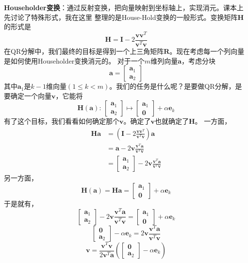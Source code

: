 \documentclass[14pt, letterpaper, UTF8, fontset=windowsnew, heading=true]{article}
\begin{document}
\textbf{Householder变换}：通过反射变换，把向量映射到坐标轴上，实现消元。课本上先讨论了特殊形式，我在这里
整理的是House-Hold变换的一般形式。变换矩阵$\bm{H}$的形式是
$$\bm{H} = \bm{I} - 2\frac{\bm{vv}^T}{\bm{v}^T\bm{v}}$$
在QR分解中，我们最终的目标是得到一个上三角矩阵$\bm{R}$。现在考虑每一个列向量是如何使用Householder变换消元的。
对于一个$m$维列向量$\bm{a}$，考虑分块
$$\bm{a}=\begin{bmatrix}\bm{a}_1\\\bm{a}_2\end{bmatrix}$$
其中$\bm{a}_1$是$k-1$维向量$(1\leq k< m)$。我们的任务是什么呢？是要做QR分解，是要确定一个向量$\bm{v}$，它能将
$$\bm{H(\bm{a})}:\,
\begin{bmatrix}\bm{a}_1\\ \bm{a}_2\end{bmatrix}
\mapsto
\begin{bmatrix}\bm{a}_1\\ \bm{0}\end{bmatrix} + \alpha \bm{e}_k
$$
有了这个目标，我们看看如何确定那个$\bm{v}$。确定了$\bm{v}$也就确定了$\bm{H}$。
一方面，
$$\begin{aligned}
\bm{Ha}
&=\left(\bm{I}-2\frac{\bm{v}\bm{v}^T}{\bm{v}^T\bm{v}}\right)\bm{a}\\
&=\bm{a}-2\bm{v}\frac{\bm{v}^T\bm{a}}{\bm{v}^T\bm{v}}\\
&=\begin{bmatrix}\bm{a}_1\\ \bm{a}_2\end{bmatrix}-2\bm{v}\frac{\bm{v}^T\bm{a}}{\bm{v}^T\bm{v}}
\end{aligned}$$
另一方面，
$$\bm{H}(\bm{a})=\bm{Ha}=\begin{bmatrix}\bm{a}_1\\ \bm{0}\end{bmatrix} + \alpha \bm{e}_k$$
于是就有，
$$\begin{bmatrix}\bm{a}_1\\ \bm{a}_2\end{bmatrix}-2\bm{v}\frac{\bm{v}^T\bm{a}}{\bm{v}^T\bm{v}}
=\begin{bmatrix}\bm{a}_1\\ \bm{0}\end{bmatrix} + \alpha \bm{e}_k$$
$$\begin{bmatrix}\bm{0}\\ \bm{a}_2\end{bmatrix} - \alpha \bm{e}_k 
=2\bm{v}\frac{\bm{v}^T\bm{a}}{\bm{v}^T\bm{v}}$$
$$\bm{v}=\frac{\bm{v}^T\bm{v}}{2\bm{v}^T\bm{a}}
\left( \begin{bmatrix}\bm{0}\\ \bm{a}_2\end{bmatrix} - \alpha \bm{e}_k \right)$$
\end{document}
